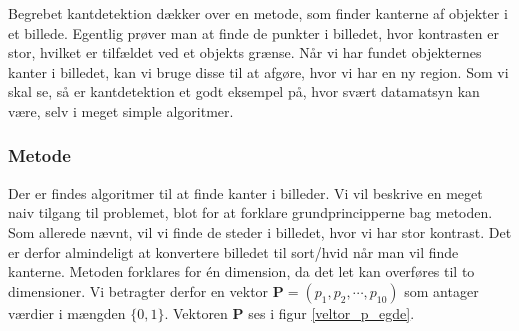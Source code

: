 {
Begrebet kantdetektion dækker over en metode, som finder kanterne af
objekter i et billede. Egentlig prøver man at finde de punkter i
billedet, hvor kontrasten er stor, hvilket er tilfældet ved et objekts
grænse. Når vi har fundet objekternes kanter i billedet, kan vi bruge
disse til at afgøre, hvor vi har en ny region.  Som vi skal se, så er
kantdetektion et godt eksempel på, hvor svært datamatsyn kan være, selv
i meget simple algoritmer.

\subsubsection*{Metode}
Der er findes algoritmer til at finde kanter i
billeder\cite{SIOlsen}. Vi vil beskrive en meget naiv tilgang til
problemet, blot for at forklare grundprincipperne bag metoden. Som
allerede nævnt, vil vi finde de steder i billedet, hvor vi har stor
kontrast. Det er derfor almindeligt at konvertere billedet til sort/hvid
når man vil finde kanterne. Metoden forklares for én dimension, da det
let kan overføres til to dimensioner. Vi betragter derfor en vektor
$\mathbf{P} = (p_1, p_2, \cdots, p_{10})$ som antager værdier i mængden
$\{0,1\}$. Vektoren $\mathbf{P}$ ses i figur \ref{veltor_p_egde}.

}
